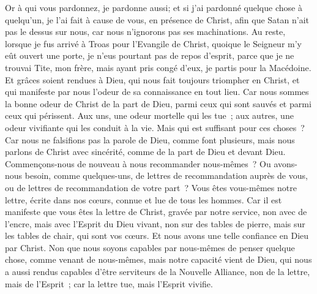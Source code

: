 \begin{multicols}{2}
Or à qui vous pardonnez, je pardonne aussi; et si j'ai pardonné quelque chose à quelqu’un, je l'ai fait à cause de vous, en présence de Christ,
afin que Satan n'ait pas le dessus sur nous, car nous n'ignorons pas ses machinations.
Au reste, lorsque je fus arrivé à Troas pour l'Evangile de Christ, quoique le Seigneur m'y eût ouvert une porte, je n'eus pourtant pas de repos d'esprit, parce que je ne trouvai Tite, mon frère,
mais ayant pris congé d'eux, je partis pour la Macédoine.
Et grâces soient rendues à Dieu, qui nous fait toujours triompher en Christ, et qui manifeste par nous l'odeur de sa connaissance en tout lieu.
Car nous sommes la bonne odeur de Christ de la part de Dieu, parmi ceux qui sont sauvés et parmi ceux qui périssent.
Aux uns, une odeur mortelle qui les tue~; aux autres, une odeur vivifiante qui les conduit à la vie. Mais qui est suffisant pour ces choses~?
Car nous ne falsifions pas la parole de Dieu, comme font plusieurs, mais nous parlons de Christ avec sincérité, comme de la part de Dieu et devant Dieu.
\VerseOne{}Commençons-nous de nouveau à nous recommander nous-mêmes~? Ou avons-nous besoin, comme quelques-uns, de lettres de recommandation auprès de vous, ou de lettres de recommandation de votre part~?
Vous êtes vous-mêmes notre lettre, écrite dans nos cœurs, connue et lue de tous les hommes.
Car il est manifeste que vous êtes la lettre de Christ, gravée par notre service, non avec de l'encre, mais avec l'Esprit du Dieu vivant, non sur des tables de pierre, mais sur les tables de chair, qui sont vos cœurs.
Et nous avons une telle confiance en Dieu par Christ.
Non que nous soyons capables par nous-mêmes de penser quelque chose, comme venant de nous-mêmes, mais notre capacité vient de Dieu,
qui nous a aussi rendus capables d'être serviteurs de la Nouvelle Alliance, non de la lettre, mais de l'Esprit~; car la lettre tue, mais l'Esprit vivifie.

\end{multicols}
